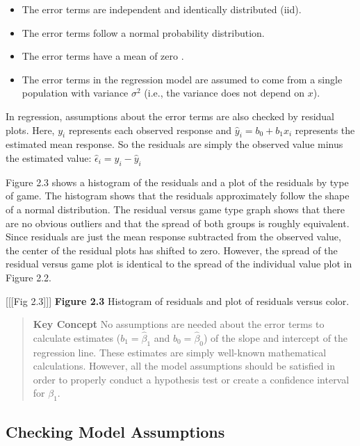 \documentclass[
]{report}
\providecommand{\tightlist}{%
  \setlength{\itemsep}{0pt}\setlength{\parskip}{0pt}}
\theoremstyle{definition}
\theoremstyle{definition}
\theoremstyle{definition}
\theoremstyle{definition}
\theoremstyle{remark}
\begin{document}
\begin{itemize}
\tightlist
\item
  The error terms are independent and identically distributed (iid).
\item
  The error terms follow a normal probability distribution.
\item
  The error terms have a mean of zero .
\item
  The error terms in the regression model are assumed to come from a single population with variance \(\sigma^2\) (i.e., the variance does not depend on \(x\)).
\end{itemize}

In regression, assumptions about the error terms are also checked by residual plots. Here, \(y_i\) represents each observed response and \(\hat{y}_i = b_0 + b_1x_i\) represents the estimated mean response. So the residuals are simply the observed value minus the estimated value: \(\hat{\epsilon}_i = y_i - \hat{y}_i\)

Figure 2.3 shows a histogram of the residuals and a plot of the residuals by type of game. The histogram shows that the residuals approximately follow the shape of a normal distribution. The residual versus game type graph shows that there are no obvious outliers and that the spread of both groups is roughly equivalent. Since residuals are just the mean response subtracted from the observed value, the center of the residual plots has shifted to zero. However, the spread of the residual versus game plot is identical to the spread of the individual value plot in Figure 2.2.

{[}{[}{[}Fig 2.3{]}{]}{]}
\textbf{Figure 2.3} Histogram of residuals and plot of residuals versus color.

\begin{quote}
\textbf{Key Concept}
No assumptions are needed about the error terms to calculate estimates (\(b_1 = \hat{\beta}_1\) and \(b_0 = \hat{\beta}_0\)) of the slope and intercept of the regression line. These estimates are simply well-known mathematical calculations. However, all the model assumptions should be satisfied in order to properly conduct a hypothesis test or create a confidence interval for \(\beta_1\).
\end{quote}

\hypertarget{checking-model-assumptions}{%
\subsection*{Checking Model Assumptions}\label{checking-model-assumptions}}
\end{document}
